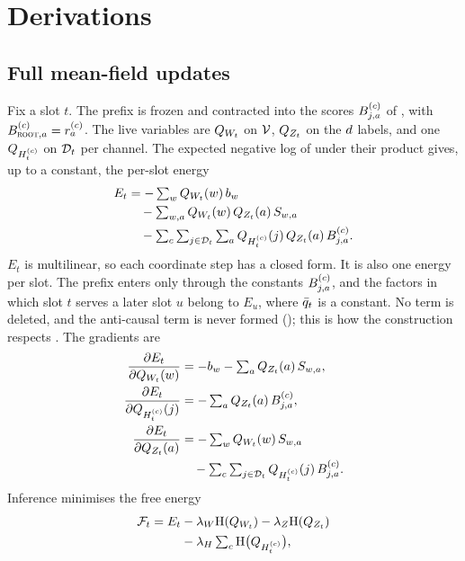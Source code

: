 \section{Derivations}
\label{app:derivations}

\subsection{Full mean-field updates}
\label{app:full-updates}

Fix a slot $t$. The prefix is frozen and contracted into the scores $B^{(c)}_{j,a}$ of
, with $B^{(c)}_{\textsc{root},a} = r^{(c)}_a$. The live variables are
$Q_{W_{t}}$ on $\mathcal{V}$, $Q_{Z_{t}}$ on the $d$ labels, and one $Q_{H_{t}^{(c)}}$ on $\mathcal{D}_{t}$ per
channel. The expected negative log of  under their product gives, up to a
constant, the per-slot energy
%
\begin{equation}
\label{eq:slot-energy}
\begin{aligned}
E_t &= -\textstyle\sum_w Q_{W_{t}}(w)\,b_w\\
    &\quad - \textstyle\sum_{w,a} Q_{W_{t}}(w)\,Q_{Z_{t}}(a)\,S_{w,a}\\
    &\quad - \textstyle\sum_c \sum_{j\in\mathcal{D}_{t}} \sum_a
             Q_{H_{t}^{(c)}}(j)\,Q_{Z_{t}}(a)\,B^{(c)}_{j,a}.
\end{aligned}
\end{equation}
%
$E_t$ is multilinear, so each coordinate step has a closed form. It is also one energy per slot.
The prefix enters only through the constants $B^{(c)}_{j,a}$, and the factors in which slot $t$
serves a later slot $u$ belong to $E_u$, where $\bar{q}_{t}$ is a constant. No term is deleted, and
the anti-causal term is never formed (); this is how the construction
respects . The gradients are
%
\begin{align}
\label{eq:grad-W}
  \frac{\partial E_t}{\partial Q_{W_{t}}(w)}
    &= -b_w - \textstyle\sum_a Q_{Z_{t}}(a)\,S_{w,a},\\
\label{eq:grad-H}
  \frac{\partial E_t}{\partial Q_{H_{t}^{(c)}}(j)}
    &= -\textstyle\sum_a Q_{Z_{t}}(a)\,B^{(c)}_{j,a},\\
\label{eq:grad-Z}
  \frac{\partial E_t}{\partial Q_{Z_{t}}(a)}
    &= -\textstyle\sum_w Q_{W_{t}}(w)\,S_{w,a}\\
    &\quad - \textstyle\sum_c \sum_{j\in\mathcal{D}_{t}} Q_{H_{t}^{(c)}}(j)\,B^{(c)}_{j,a}.\nonumber
\end{align}
%
Inference minimises the free energy
%
\begin{equation}
\label{eq:slot-free-energy}
\begin{aligned}
  \mathcal{F}_t = E_t &- \lambda_W \mathrm{H}(Q_{W_{t}}) - \lambda_Z \mathrm{H}(Q_{Z_{t}})\\
                &- \lambda_H \textstyle\sum_c \mathrm{H}\big(Q_{H_{t}^{(c)}}\big),
\end{aligned}
\end{equation}
